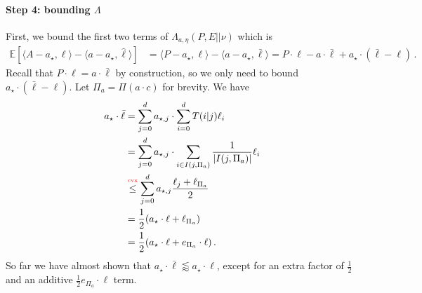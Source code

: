 \documentclass{article}
\theoremstyle{plain}
\theoremstyle{definition}
\newcommand{\E}{\mathbb E}
\newcommand{\abovelabel}[1]{\stackrel{\raisebox{0.5mm}{\textrm{\tiny \color{red} #1}}}}
\newcommand{\hl}{\hat{\ell}\xspace}
\begin{document}
\paragraph{Step 4: bounding $\Lambda$}
First, we bound the first two terms of $\Lambda_{a, \eta}(P, E || \nu)$ which is
\begin{align*}
    \E\!\left[
        \langle A - a_\star, \ell \rangle
        - \langle a - a_\star, \hl \rangle
        \right]
     & =
    \langle P - a_\star, \ell \rangle
    - \langle a - a_\star, \bar{\ell} \rangle
    = P\cdot \ell - a \cdot \bar{\ell} + a_\star \cdot (\bar{\ell} - \ell)
    \,.
\end{align*}
Recall that $P \cdot \ell = a \cdot \bar{\ell}$ by construction,
so we only need to bound $a_\star \cdot (\bar{\ell} - \ell)$.
Let $\Pi_a = \Pi(a \cdot c)$ for brevity.
We have
\begin{align}
    a_\star \cdot \bar{\ell}
     & =
    \sum_{j=0}^{d}
    a_{\star, j} \cdot
    \sum_{i=0}^{d}
    T(i | j) \ell_i                 \nonumber
    \\
     & =
    \sum_{j=0}^{d}
    a_{\star, j} \cdot
    \sum_{i \in I(j, \Pi_a)}
    \frac{1}{|I(j, \Pi_a)|} \ell_i  \nonumber
    \\
     &
    \abovelabel{cvx}
    \leq
    \sum_{j=0}^{d}
    a_{\star, j}
    \frac{\ell_j + \ell_{\Pi_a}}{2} \nonumber
    \\
     &
    =
    \frac12
    (
    a_{\star} \cdot \ell
    +
    \ell_{\Pi_a}
    )
    \nonumber
    \\
     &
    =
    \frac12
    (
    a_{\star} \cdot \ell
    +
    e_{\Pi_a} \cdot \ell
    )\,.
    \label{eq:kernel-checkpoint1}
\end{align}
So far we have almost shown that $a_\star \cdot \bar \ell \lessapprox a_\star \cdot \ell$,
except for an extra factor of $\frac12$ and an additive $\frac12 e_{\Pi_a} \cdot \ell$ term.
\end{document}
